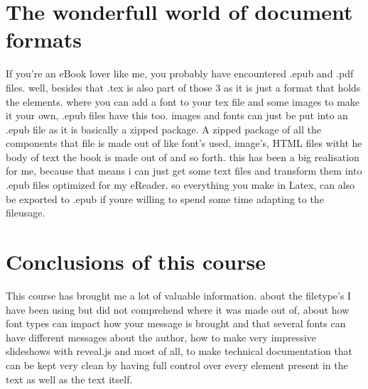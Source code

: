 \documentclass{article}
\begin{document}
\section{The wonderfull world of document formats}
If you're an eBook lover like me, you probably have encountered .epub and .pdf files. well, besides that .tex is also part of those 3 as it is just a format that holds the elements. where you can add a font to your tex file and some images to make it your own, .epub files have this too. images and fonts can just be put into an .epub file as it is basically a zipped package. A zipped package of all the components that file is made out of like font's used, image's, HTML files witht he body of text the book is made out of and so forth. this has been a big realisation for me, because that means i can just get some text files and transform them into .epub files optimized for my eReader. so everything you make in Latex, can also be exported to .epub if youre willing to spend some time adapting to the fileusage.


\section{Conclusions of this course}
This course has brought me a lot of valuable information. about the filetype's I have been using but did not comprehend where it was made out of, about how font types can impact how your message is brought and that several fonts can have different messages about the author, how to make very impressive slideshows with reveal.js and most of all, to make technical documentation that can be kept very clean by having full control over every element present in the text as well as the text itself.
\end{document}

